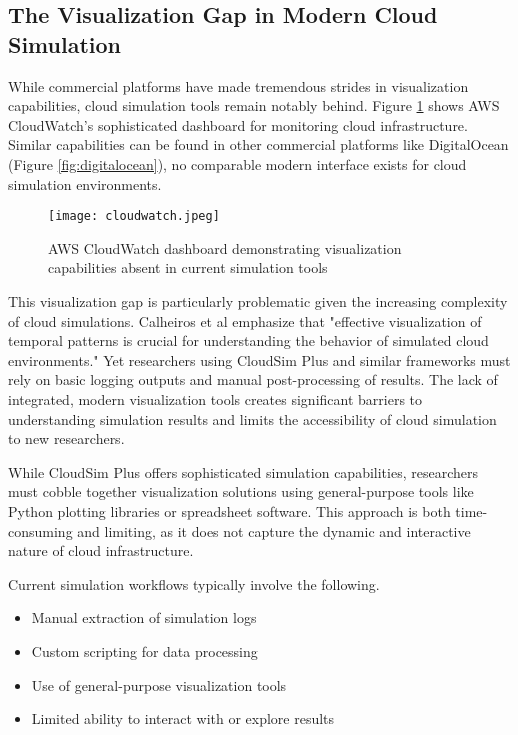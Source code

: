 \subsection{The Visualization Gap in Modern Cloud Simulation}
While commercial platforms have made tremendous strides in visualization capabilities, cloud simulation tools remain notably behind. Figure \ref{fig:cloudwatch} shows AWS CloudWatch's sophisticated dashboard for monitoring cloud infrastructure. Similar capabilities can be found in other commercial platforms like DigitalOcean (Figure \ref{fig:digitalocean}), no comparable modern interface exists for cloud simulation environments.

\begin{figure}[h]
\texttt{[image: cloudwatch.jpeg]}
\caption{AWS CloudWatch dashboard demonstrating visualization capabilities absent in current simulation tools}
\label{fig:cloudwatch}
\end{figure}

This visualization gap is particularly problematic given the increasing complexity of cloud simulations. Calheiros et al\cite{calheiros2011cloudsim} emphasize that "effective visualization of temporal patterns is crucial for understanding the behavior of simulated cloud environments." Yet researchers using CloudSim Plus and similar frameworks must rely on basic logging outputs and manual post-processing of results. The lack of integrated, modern visualization tools creates significant barriers to understanding simulation results and limits the accessibility of cloud simulation to new researchers.


While CloudSim Plus offers sophisticated simulation capabilities, researchers must cobble together visualization solutions using general-purpose tools like Python plotting libraries or spreadsheet software. This approach is both time-consuming and limiting, as it does not capture the dynamic and interactive nature of cloud infrastructure.

Current simulation workflows typically involve the following.
\begin{itemize}
    \item Manual extraction of simulation logs
    \item Custom scripting for data processing
    \item Use of general-purpose visualization tools
    \item Limited ability to interact with or explore results
\end{itemize}

